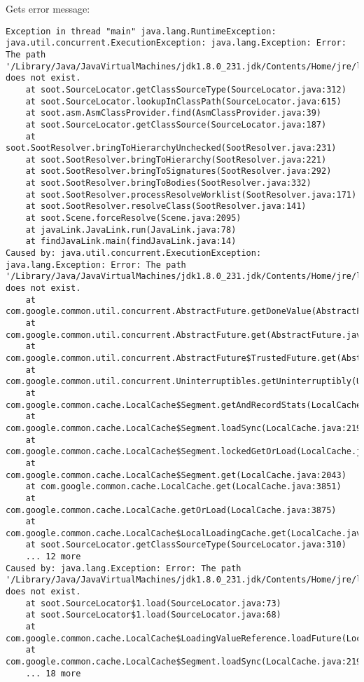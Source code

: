 Gets error message:
\begin{lstlisting}
Exception in thread "main" java.lang.RuntimeException: java.util.concurrent.ExecutionException: java.lang.Exception: Error: The path '/Library/Java/JavaVirtualMachines/jdk1.8.0_231.jdk/Contents/Home/jre/lib/rt.jar' does not exist.
    at soot.SourceLocator.getClassSourceType(SourceLocator.java:312)
    at soot.SourceLocator.lookupInClassPath(SourceLocator.java:615)
    at soot.asm.AsmClassProvider.find(AsmClassProvider.java:39)
    at soot.SourceLocator.getClassSource(SourceLocator.java:187)
    at soot.SootResolver.bringToHierarchyUnchecked(SootResolver.java:231)
    at soot.SootResolver.bringToHierarchy(SootResolver.java:221)
    at soot.SootResolver.bringToSignatures(SootResolver.java:292)
    at soot.SootResolver.bringToBodies(SootResolver.java:332)
    at soot.SootResolver.processResolveWorklist(SootResolver.java:171)
    at soot.SootResolver.resolveClass(SootResolver.java:141)
    at soot.Scene.forceResolve(Scene.java:2095)
    at javaLink.JavaLink.run(JavaLink.java:78)
    at findJavaLink.main(findJavaLink.java:14)
Caused by: java.util.concurrent.ExecutionException: java.lang.Exception: Error: The path '/Library/Java/JavaVirtualMachines/jdk1.8.0_231.jdk/Contents/Home/jre/lib/rt.jar' does not exist.
    at com.google.common.util.concurrent.AbstractFuture.getDoneValue(AbstractFuture.java:552)
    at com.google.common.util.concurrent.AbstractFuture.get(AbstractFuture.java:513)
    at com.google.common.util.concurrent.AbstractFuture$TrustedFuture.get(AbstractFuture.java:90)
    at com.google.common.util.concurrent.Uninterruptibles.getUninterruptibly(Uninterruptibles.java:197)
    at com.google.common.cache.LocalCache$Segment.getAndRecordStats(LocalCache.java:2229)
    at com.google.common.cache.LocalCache$Segment.loadSync(LocalCache.java:2195)
    at com.google.common.cache.LocalCache$Segment.lockedGetOrLoad(LocalCache.java:2153)
    at com.google.common.cache.LocalCache$Segment.get(LocalCache.java:2043)
    at com.google.common.cache.LocalCache.get(LocalCache.java:3851)
    at com.google.common.cache.LocalCache.getOrLoad(LocalCache.java:3875)
    at com.google.common.cache.LocalCache$LocalLoadingCache.get(LocalCache.java:4800)
    at soot.SourceLocator.getClassSourceType(SourceLocator.java:310)
    ... 12 more
Caused by: java.lang.Exception: Error: The path '/Library/Java/JavaVirtualMachines/jdk1.8.0_231.jdk/Contents/Home/jre/lib/rt.jar' does not exist.
    at soot.SourceLocator$1.load(SourceLocator.java:73)
    at soot.SourceLocator$1.load(SourceLocator.java:68)
    at com.google.common.cache.LocalCache$LoadingValueReference.loadFuture(LocalCache.java:3445)
    at com.google.common.cache.LocalCache$Segment.loadSync(LocalCache.java:2194)
    ... 18 more
\end{lstlisting}

